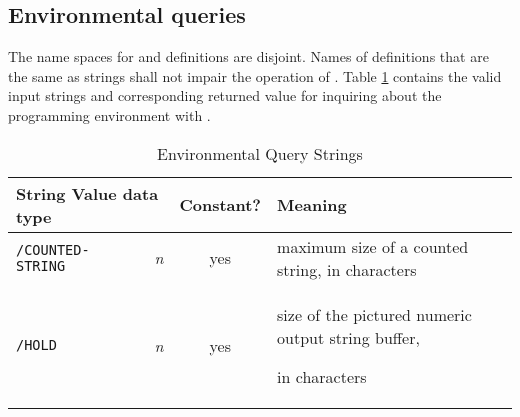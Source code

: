 \subsection{Environmental queries} %
\label{usage:env}

The name spaces for  and definitions are
disjoint. Names of definitions that are the same as
 strings shall not impair the operation of
. Table \ref{table:env} contains
the valid input strings and corresponding returned value for
inquiring about the programming environment with
.

\begin{table}[ht]
  \begin{center}
	\caption{Environmental Query Strings}
	\label{table:env}
	\begin{tabular}{p{11em}rcp{}}
		\hline\hline
		\multicolumn{2}{l}{String \hfill Value data type} & Constant? & Meaning \\
		\hline
		\texttt{/COUNTED-STRING}	& \emph{n}		& yes	&
			maximum size of a counted string, in characters \\
		\texttt{/HOLD}					& \emph{n}		& yes	&
			size of the pictured numeric output string buffer,

			in characters \\


\end{tabular}
\end{center}
\end{table}
